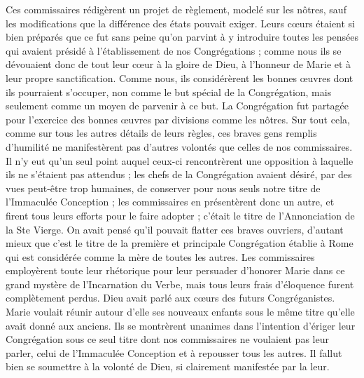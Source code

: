 Ces commissaires rédigèrent un projet de règlement, modelé sur les nôtres, sauf les modifications que la différence des états pouvait exiger. Leurs cœurs étaient si bien préparés que ce fut sans peine qu'on parvint à y introduire toutes les pensées qui avaient présidé à l'établissement de nos Congrégations ; comme nous ils se dévouaient donc de tout leur cœur à la gloire de Dieu, à l'honneur de Marie et à leur propre sanctification. Comme nous, ils considérèrent les bonnes œuvres dont ils pourraient s'occuper, non comme le but spécial de la Congrégation, mais seulement comme un moyen de parvenir à ce but. La Congrégation fut partagée pour l'exercice des bonnes œuvres par divisions comme les nôtres. Sur tout cela, comme sur tous les autres détails de leurs règles, ces braves gens remplis d'humilité ne manifestèrent pas d'autres volontés que celles de nos commissaires. Il n'y eut qu'un seul point auquel ceux-ci
rencontrèrent une opposition à laquelle ils ne s'étaient pas attendus ; les chefs de la Congrégation avaient désiré, par des vues peut-être trop humaines, de conserver pour nous seuls notre titre de l'Immaculée Conception ; les commissaires en présentèrent donc un autre, et firent tous leurs efforts pour le faire adopter ; c'était le titre de l'Annonciation de la Ste Vierge. On avait pensé qu'il pouvait flatter ces braves ouvriers, d'autant mieux que c'est le titre de la première et principale Congrégation établie à Rome qui est considérée comme la mère de toutes les autres. Les commissaires employèrent toute leur rhétorique pour leur persuader d'honorer Marie dans ce grand mystère de l'Incarnation du Verbe, mais tous leurs frais d'éloquence furent complètement perdus. Dieu avait parlé aux cœurs des futurs Congréganistes. Marie voulait réunir autour d'elle ses nouveaux enfants sous le même titre qu'elle avait donné aux anciens. Ils se montrèrent unanimes dans l'intention d'ériger leur Congrégation sous ce seul titre dont nos commissaires ne voulaient pas leur parler, celui de l'Immaculée Conception et à repousser tous les autres. Il fallut bien se soumettre à la volonté de Dieu, si clairement manifestée par la leur.

